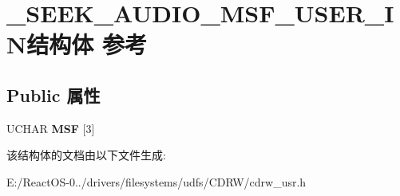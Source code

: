 \hypertarget{struct___s_e_e_k___a_u_d_i_o___m_s_f___u_s_e_r___i_n}{}\section{\+\_\+\+S\+E\+E\+K\+\_\+\+A\+U\+D\+I\+O\+\_\+\+M\+S\+F\+\_\+\+U\+S\+E\+R\+\_\+\+I\+N结构体 参考}
\label{struct___s_e_e_k___a_u_d_i_o___m_s_f___u_s_e_r___i_n}
\subsection*{Public 属性}
\begin{DoxyCompactItemize}
\item 
\mbox{\label{struct___s_e_e_k___a_u_d_i_o___m_s_f___u_s_e_r___i_n_a9434925541e6d63f8ee7c459d81b9c15}} 
U\+C\+H\+AR {\bfseries M\+SF} \mbox{[}3\mbox{]}
\end{DoxyCompactItemize}


该结构体的文档由以下文件生成\+:\begin{DoxyCompactItemize}
\item 
E\+:/\+React\+O\+S-\/0../drivers/filesystems/udfs/\+C\+D\+R\+W/cdrw\+\_\+usr.\+h\end{DoxyCompactItemize}
